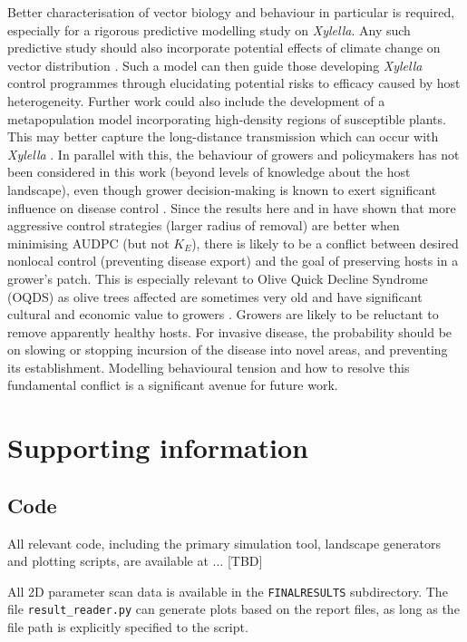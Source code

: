 \documentclass[11pt,letterpaper]{article}
\begin{document}
{Better characterisation of vector biology and behaviour in particular is required, especially for a rigorous predictive modelling study on \emph{Xylella}. Any such predictive study should also incorporate potential effects of climate change on vector distribution \cite{GimenezRomero2024}. Such a model can then guide those developing \emph{Xylella} control programmes through elucidating potential risks to efficacy caused by host heterogeneity.  Further work could also include the development of a metapopulation model incorporating high-density regions of susceptible plants. This may better capture the long-distance transmission which can occur with \emph{Xylella} \cite{White2017}. In parallel with this, the behaviour of growers and policymakers has not been considered in this work (beyond levels of knowledge about the host landscape), even though grower decision-making is known to exert significant influence on disease control \cite{MurrayWatson2022}. Since the results here and in \cite{Cunniffe2015} have shown that more aggressive control strategies (larger radius of removal) are better when minimising AUDPC (but not $K_E$), there is likely to be a conflict between desired nonlocal control (preventing disease export) and the goal of preserving hosts in a grower's patch. This is especially relevant to Olive Quick Decline Syndrome (OQDS) as olive trees affected are sometimes very old and have significant cultural and economic value to growers \cite{Russo2020}. Growers are likely to be reluctant to remove apparently healthy hosts.  For invasive disease, the probability should be on slowing or stopping incursion of the disease into novel areas, and preventing its establishment. Modelling behavioural tension and how to resolve this fundamental conflict is a significant avenue for future work. 
 
 \section*{Supporting information}

\subsection*{Code}

All relevant code, including the primary simulation tool, landscape generators and plotting scripts, are available at ... [TBD] 

All 2D parameter scan data is available in the \texttt{FINALRESULTS} subdirectory. The file \texttt{result\_reader.py} can generate plots based on the report files, as long as the file path is explicitly specified to the script.


}
\end{document}
